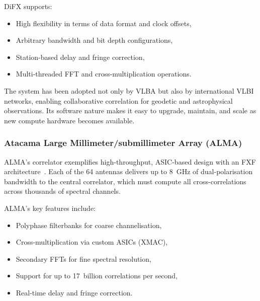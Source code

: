         DiFX supports:
        
        \begin{itemize}
            \item High flexibility in terms of data format and clock offsets,
            
            \item Arbitrary bandwidth and bit depth configurations,
            
            \item Station-based delay and fringe correction,
            
            \item Multi-threaded FFT and cross-multiplication operations.
        \end{itemize}

        The system has been adopted not only by VLBA but also by international VLBI networks, enabling collaborative correlation for geodetic and astrophysical observations. Its software nature makes it easy to upgrade, maintain, and scale as new compute hardware becomes available.

        \subsubsection{Atacama Large Millimeter/submillimeter Array (ALMA)}
        ALMA’s correlator exemplifies high-throughput, ASIC-based design with an FXF architecture~\cite{Escoffier2007}. Each of the 64 antennas delivers up to 8~GHz of dual-polarisation bandwidth to the central correlator, which must compute all cross-correlations across thousands of spectral channels.

        ALMA’s key features include:

        \begin{itemize}
            \item Polyphase filterbanks for coarse channelisation,
            
            \item Cross-multiplication via custom ASICs (XMAC),
            
            \item Secondary FFTs for fine spectral resolution,
            
            \item Support for up to 17~billion correlations per second,
            
            \item Real-time delay and fringe correction.
        \end{itemize}
        
